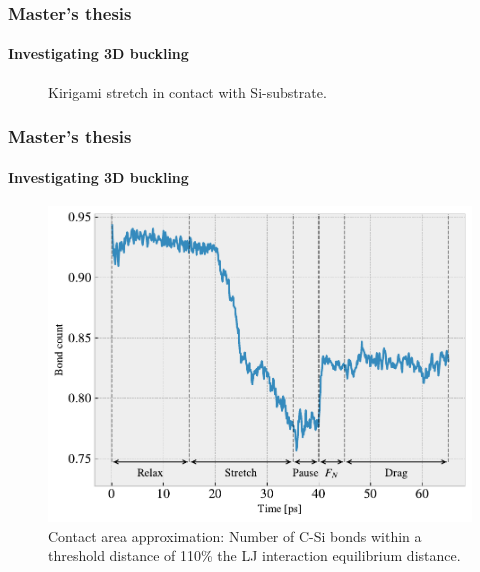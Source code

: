 \documentclass[
	10pt, %
]{beamer}
\begin{document}
\begin{frame}
	\frametitle{Master's thesis}
	\framesubtitle{Investigating 3D buckling}
	\begin{figure}
		\centering    
		\caption{Kirigami stretch in contact with Si-substrate.}
	\end{figure} 
\end{frame}


\begin{frame}
	\frametitle{Master's thesis}
	\framesubtitle{Investigating 3D buckling}
	\begin{figure}
		\includegraphics[width=0.7\linewidth]{figures/contact_pct.pdf}
		\caption{Contact area approximation: Number of C-Si bonds within a threshold distance of 110\% the LJ interaction equilibrium distance.}
	\end{figure}	
\end{frame}
\end{document}
